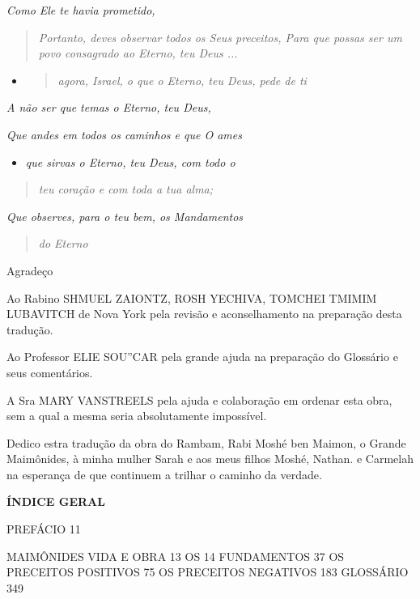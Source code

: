 \emph{Como Ele te havia prometido,}

\begin{quote}
\emph{Portanto, deves observar todos os Seus preceitos, Para que possas
ser um povo consagrado ao Eterno, teu Deus ...}
\end{quote}

\begin{itemize}
\item
 \begin{quote}
 \emph{agora, Israel, o que o Eterno, teu Deus, pede de ti}
 \end{quote}
\end{itemize}

\emph{A não ser que temas o Eterno, teu Deus,}

\emph{Que andes em todos os caminhos e que O ames}

\begin{itemize}
\item
 \emph{que sirvas o Eterno, teu Deus, com todo o}
\end{itemize}

\begin{quote}
\emph{teu coração e com toda a tua alma;}
\end{quote}

\emph{Que observes, para o teu bem, os Mandamentos}

\begin{quote}
\emph{do Eterno}
\end{quote}

Agradeço

Ao Rabino SHMUEL ZAIONTZ, ROSH YECHIVA, TOMCHEI TMIMIM LUBAVITCH de Nova
York pela revisão e aconselhamento na preparação desta tradução.

Ao Professor ELIE SOU''CAR pela grande ajuda na preparação do Glossário
e seus comentários.

A Sra MARY VANSTREELS pela ajuda e colabora­ção em ordenar esta obra,
sem a qual a mesma se­ria absolutamente impossível.

Dedico estra tradução da obra do Rambam, Rabi Moshé ben Maimon, o Grande
Maimônides, à minha mulher Sarah e aos meus filhos Moshé,
Nathan. e Carmelah na esperança de que continuem a
trilhar o caminho da verdade.

\textbf{ÍNDICE GERAL}

PREFÁCIO 11

MAIMÔNIDES VIDA E OBRA 13 OS 14 FUNDAMENTOS 37 OS PRECEITOS POSITIVOS 75
OS PRECEITOS NEGATIVOS 183 GLOSSÁRIO 349

